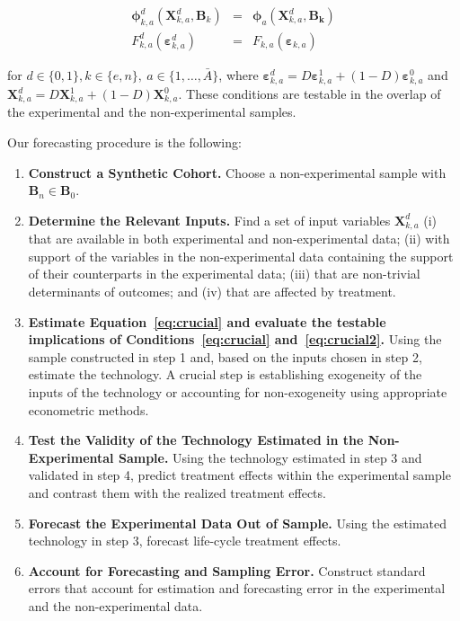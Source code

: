 \begin{subequations}
\begin{eqnarray}
\bm{\phi}^d_{k,a} (\bm{X}^d_{k,a}, \bm{B}_k) &=& \bm{\phi}_{a} (\bm{X}^d_{k,a}, \bm{B_k}) \label{eq:crucial} \\
F_{k,a}^d \left( \bm{\varepsilon}_{k,a}^d \right) &=&  F_{k,a} \left( \bm{\varepsilon}_{k,a} \right) \label{eq:crucial2}
\end{eqnarray}
\end{subequations}

\noindent for $d \in\{0,1\},  k\in\{e,n\}, \  a\in\{1,\dots,\bar{A}\}$, where $\bm{\varepsilon}_{k,a}^d = D\bm{\varepsilon}_{k,a}^1 + (1-D)\bm{\varepsilon}_{k,a}^0$ and $\bm{X}^d_{k,a} = D\bm{X}^1_{k,a}+(1-D)\bm{X}^0_{k,a}$. These conditions are testable in the overlap of the experimental and the non-experimental samples.

Our forecasting procedure is the following:

\begin{enumerate}
\item \textbf{Construct a Synthetic Cohort.} Choose a non-experimental sample with $\bm{B}_n \in \bm{B}_0$.
\item \textbf{Determine the Relevant Inputs.} Find a set of input variables $\bm{X}^d_{k,a}$ (i) that are available in both experimental and non-experimental data; (ii) with support of the variables in the non-experimental data containing the support of their counterparts in the experimental data; (iii) that are non-trivial determinants of outcomes; and (iv) that are affected by treatment.
\item \textbf{Estimate Equation~\eqref{eq:crucial} and evaluate the testable implications of Conditions~\eqref{eq:crucial} and~\eqref{eq:crucial2}.} Using the sample constructed in step 1 and, based on the inputs chosen in step 2, estimate the technology. A crucial step is establishing exogeneity of the inputs of the technology or accounting for non-exogeneity using appropriate econometric methods.
\item \textbf{Test the Validity of the Technology Estimated in the Non-Experimental Sample.} Using the technology estimated in step 3 and validated in step 4, predict treatment effects within the experimental sample and contrast them with the realized treatment effects.
\item \textbf{Forecast the Experimental Data Out of Sample.} Using the estimated technology in step 3, forecast life-cycle treatment effects.
\item \textbf{Account for Forecasting and Sampling Error.} Construct standard errors that account for estimation and forecasting error in the experimental and the non-experimental data.
\end{enumerate}

